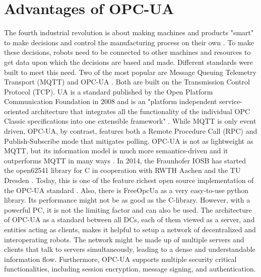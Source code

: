 \documentclass[conference]{IEEEtran}
\begin{document}
\section{Advantages of OPC-UA}
The fourth industrial revolution is about making machines and products "smart" to make decisions and control the manufacturing process on their own \cite{Industry4}.
To make these decisions, robots need to be connected to other machines and resources to get data upon which the decisions are based and made.
Different standards were built to meet this need. Two of the most popular are Message Queuing Telemetry Transport (MQTT) and OPC-UA \cite{CommTechnology}.
Both are built on the Transmission Control Protocol (TCP).
UA is a standard published by the Open Platform Communication Foundation in 2008 and is an "platform independent service-oriented architecture that integrates all the functionality of the individual OPC Classic specifications into one extensible framework" \cite{OPCUA}.
While MQTT is only event driven, OPC-UA, by contrast, features both a Remote Procedure Call (RPC) and   Publish-Subscribe mode \cite{OPCUA} that mitigates polling. 
OPC-UA is not as lightweight as MQTT, but its information model is much more semantics-driven and it outperforms MQTT in many ways \cite{CommunicationCommarison}.
In 2014, the Fraunhofer IOSB has started the open62541 library for C in cooperation with RWTH Aachen and the TU Dresden \cite{open62541}.
Today, this is one of the feature richest open source implementation of the OPC-UA standard \cite{ComparOPCUAPaper}.
Also, there is FreeOpcUa as a very easy-to-use python library.
Its performance might not be as good as the C-library. However, with a powerful PC, it is not the limiting factor and can also be used.
The architecture of OPC-UA as a standard between all DCs, each of them viewed as a server, and entities acting as clients,  makes it helpful to setup a network of decentralized and interoperating robots.
The network might be made up of multiple servers and clients that  talk to servers simultaneously, leading to a dense and understandable information flow. Furthermore, OPC-UA supports  multiple security critical functionalities, including session encryption, message signing, and authentication. \cite{OPCUA}
\end{document}
